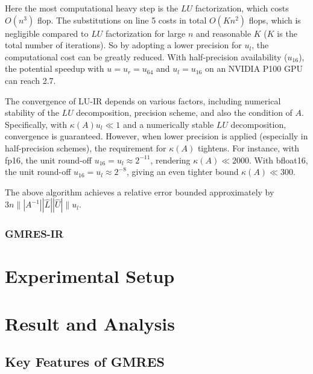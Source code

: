 \documentclass[12pt]{article}
\begin{document}
Here the most computational heavy step is the $LU$ factorization, which costs $O(n^3)$ flop. The substitutions on line 5 costs in total $O(Kn^2)$ flops, which is negligible compared to $LU$ factorization for large $n$ and reasonable $K$ ($K$ is the total number of iterations). So by adopting a lower precision for $u_l$, the computational cost can be greatly reduced. With half-precision availability ($u_{16}$), the potential speedup with $u=u_r=u_{64}$ and $u_l=u_{16}$ on an NVIDIA P100 GPU can reach 2.7. 

The convergence of LU-IR depends on various factors, including numerical stability of the $LU$ decomposition, precision scheme, and also the condition of $A$. Specifically, with $\kappa(A)u_l \ll 1$ and a numerically stable $LU$ decomposition, convergence is guaranteed. However, when lower precision is applied (especially in half-precision schemes), the requirement for $\kappa(A)$ tightens. For instance, with fp16, the unit round-off $u_{16}=u_l\approx 2^{-11}$, rendering $\kappa(A)\ll 2000$. With bfloat16, the unit round-off $u_{16}=u_l\approx 2^{-8}$, giving an even tighter bound $\kappa(A)\ll 300$.

The above algorithm achieves a relative error bounded approximately by $3n\||A^{-1}||\hat{L}||\hat{U}|\|u_l$.


\subsubsection{GMRES-IR}
\section{Experimental Setup}
\section{Result and Analysis}














\subsection{Key Features of GMRES}
\end{document}
